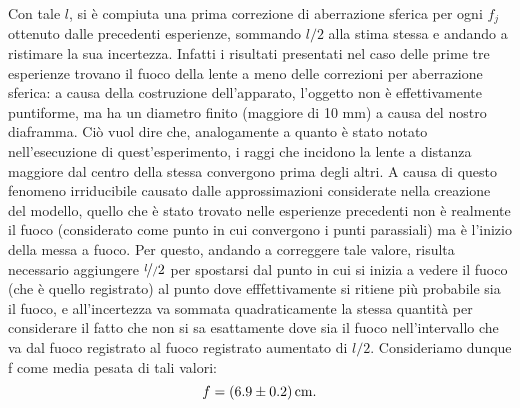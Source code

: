 Con tale $l$, si \`e compiuta una prima correzione di aberrazione sferica per ogni $f_j$ ottenuto dalle precedenti esperienze, sommando $l/2$ alla stima stessa e andando a ristimare la sua incertezza. Infatti i risultati presentati nel caso delle prime tre esperienze trovano il fuoco della lente a meno delle correzioni per aberrazione sferica: a causa della costruzione dell'apparato, l'oggetto non è effettivamente puntiforme, ma ha un diametro finito (maggiore di 10 mm) a causa del nostro diaframma. Ciò vuol dire che, analogamente a quanto è stato notato nell'esecuzione di quest'esperimento, i raggi che incidono la lente a distanza maggiore dal centro della stessa convergono prima degli altri. A causa di questo fenomeno irriducibile causato dalle approssimazioni considerate nella creazione del modello, quello che è stato trovato nelle esperienze precedenti non è realmente il fuoco (considerato come punto in cui convergono i punti parassiali) ma è l'inizio della messa a fuoco. Per questo, andando a correggere tale valore, risulta necessario aggiungere $\nicefrac l/2$ per spostarsi dal punto in cui si inizia a vedere il fuoco (che è quello registrato) al punto dove efffettivamente si ritiene più probabile sia il fuoco, e all'incertezza va sommata quadraticamente la stessa quantità per considerare il fatto che non si sa esattamente dove sia il fuoco nell'intervallo che va dal fuoco registrato al fuoco registrato aumentato di $l/2$. Consideriamo dunque f come media pesata di tali valori:
\[ f = (6.9 \pm 0.2) \,\mathrm{cm}. \] 

